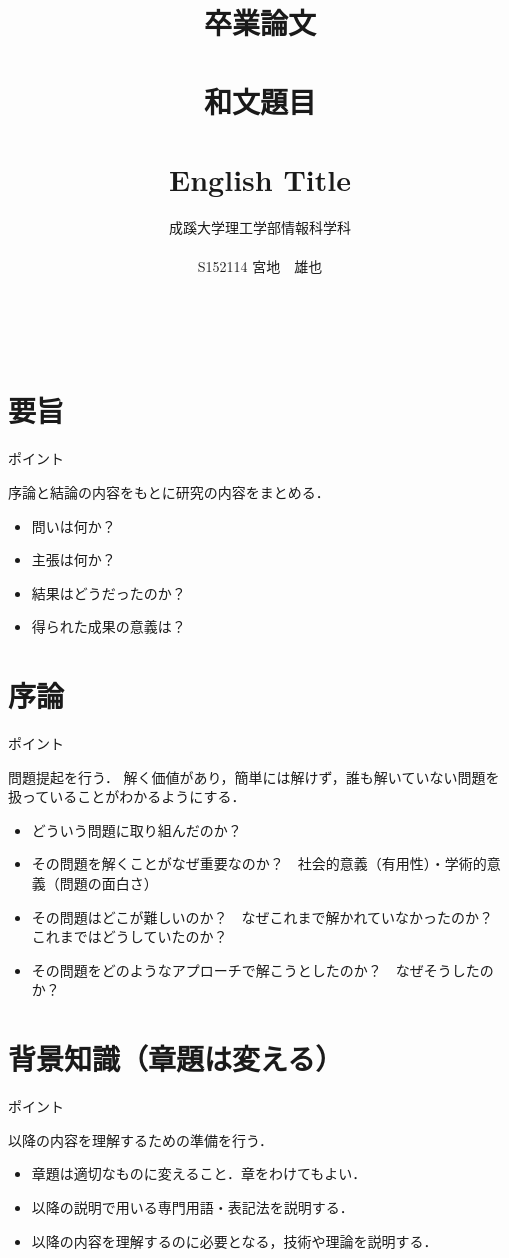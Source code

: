 \documentclass[a4j,11pt,report]{jsbook}
\title{卒業論文\\　\vspace{3em}\\{\huge #1}\\　\\#2\vspace{15em}}%
\author{{\huge 成蹊大学理工学部情報科学科}\\　\\{\huge #3}}%
\date{}
\newcommand{\frontpage}[3]{%
\title{卒業論文\\　\vspace{3em}\\{\huge #1}\\　\\#2\vspace{15em}}%
\author{{\huge 成蹊大学理工学部情報科学科}\\　\\{\huge #3}}%
\date{}
\maketitle
\clearpage
\thispagestyle{empty}
　
\clearpage
}
\newcommand{\point}[1]{
\begin{itembox}[l]{ポイント}
#1
\end{itembox}
}
\begin{document}
\frontpage  %
{和文題目}
{English Title}
{S152114 宮地　雄也}

\chapter*{要旨}
\thispagestyle{empty}
\point{
序論と結論の内容をもとに研究の内容をまとめる．
\begin{itemize}
\item 問いは何か？
\item 主張は何か？
\item 結果はどうだったのか？
\item 得られた成果の意義は？
\end{itemize}
}

\tableofcontents
\thispagestyle{empty}
\clearpage
\thispagestyle{plain}
\setcounter{page}{1}

\chapter{序論 \label{ch:introduction}}

\point{
問題提起を行う．
解く価値があり，簡単には解けず，誰も解いていない問題を扱っていることがわかるようにする．
\begin{itemize}
\item どういう問題に取り組んだのか？
\item その問題を解くことがなぜ重要なのか？　社会的意義（有用性）・学術的意義（問題の面白さ）
\item その問題はどこが難しいのか？　なぜこれまで解かれていなかったのか？　これまではどうしていたのか？
\item その問題をどのようなアプローチで解こうとしたのか？　なぜそうしたのか？
\end{itemize}
}

\chapter{背景知識（章題は変える）\label{ch:background}}

\point{
以降の内容を理解するための準備を行う．
\begin{itemize}
\item 章題は適切なものに変えること．章をわけてもよい．
\item 以降の説明で用いる専門用語・表記法を説明する．
\item 以降の内容を理解するのに必要となる，技術や理論を説明する．
\end{itemize}
}
\end{document}
